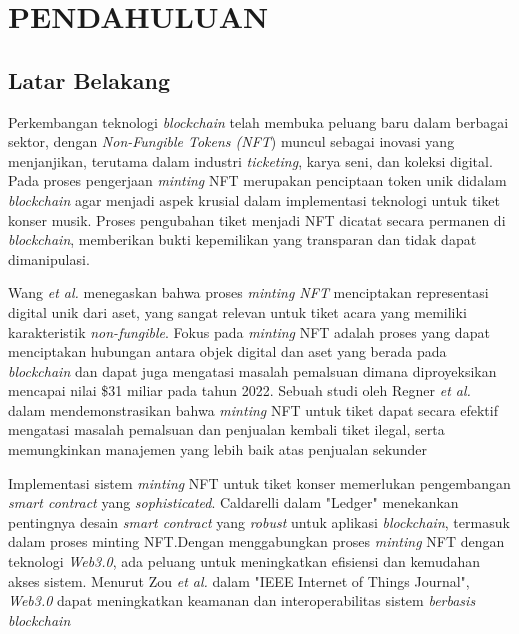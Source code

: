\chapter{PENDAHULUAN}

\section{Latar Belakang}

    

Perkembangan teknologi \textit{blockchain} telah membuka peluang baru dalam berbagai sektor, dengan \textit{Non-Fungible Tokens (NFT}) muncul sebagai inovasi yang menjanjikan, terutama dalam industri \textit{ticketing}, karya seni, dan koleksi digital. Pada proses pengerjaan \textit{minting} NFT merupakan penciptaan token unik didalam \textit{blockchain} agar menjadi aspek krusial dalam implementasi teknologi untuk tiket konser musik. Proses pengubahan tiket menjadi NFT dicatat secara permanen di \textit{blockchain}, memberikan bukti kepemilikan yang transparan dan tidak dapat dimanipulasi.

Wang \textit{et al.}  menegaskan bahwa proses \textit{minting NFT }menciptakan representasi digital unik dari aset, yang sangat relevan untuk tiket acara yang memiliki karakteristik \textit{non-fungible}\cite{ref1}. Fokus pada\textit{ minting} NFT adalah proses yang dapat menciptakan hubungan antara objek digital dan aset yang berada pada \textit{blockchain} dan dapat juga mengatasi masalah pemalsuan dimana diproyeksikan mencapai nilai \$31 miliar pada tahun 2022\cite{ref2}. Sebuah studi oleh Regner \textit{et al.}  dalam mendemonstrasikan bahwa \textit{minting} NFT untuk tiket dapat secara efektif mengatasi masalah pemalsuan dan penjualan kembali tiket ilegal, serta memungkinkan manajemen yang lebih baik atas penjualan sekunder\cite{ref3}

Implementasi sistem \textit{minting} NFT untuk tiket konser memerlukan pengembangan \textit{smart contract} yang \textit{sophisticated}. Caldarelli  dalam "Ledger" menekankan pentingnya desain \textit{smart contract} yang \textit{robust} untuk aplikasi \textit{blockchain}, termasuk dalam proses minting NFT\cite{ref4}.Dengan menggabungkan proses \textit{minting} NFT dengan teknologi \textit{Web3.0}, ada peluang untuk meningkatkan efisiensi dan kemudahan akses sistem. Menurut Zou \textit{et al.} dalam "IEEE Internet of Things Journal", \textit{Web3.0 }dapat meningkatkan keamanan dan interoperabilitas sistem \textit{berbasis} \textit{blockchain}\cite{ref5}

